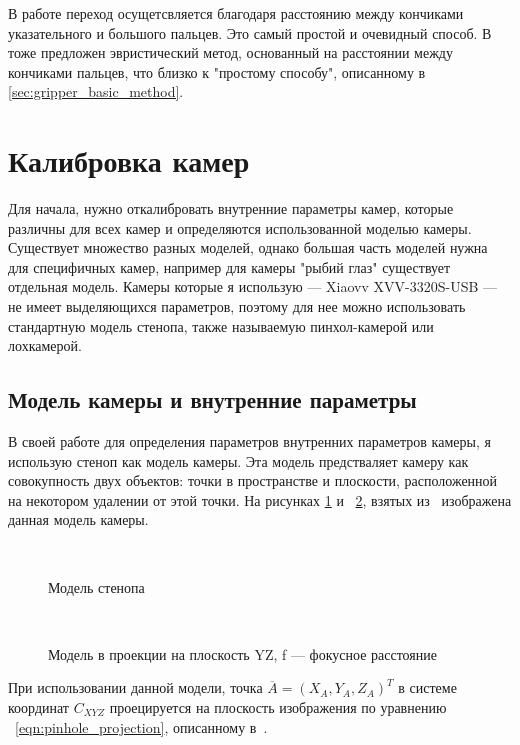 \documentclass[12pt, a4paper]{article}
\begin{document}
В работе \cite{literally-me} переход осущетсвляется благодаря расстоянию между
кончиками указательного и большого пальцев. Это самый простой и очевидный
способ. В~\cite{gesture_control} тоже предложен эвристический метод, основанный
на расстоянии между кончиками пальцев, что близко к "простому способу",
описанному в \ref{sec:gripper_basic_method}.

\section{Калибровка камер}
Для начала, нужно откалибровать внутренние параметры камер, которые различны
для всех камер и определяются использованной моделью камеры. Существует
множество разных моделей, однако большая часть моделей нужна для специфичных
камер, например для камеры "рыбий глаз" существует отдельная модель. Камеры
которые я использую --- Xiaovv XVV-3320S-USB --- не имеет выделяющихся
параметров, поэтому для нее можно использовать стандартную модель стенопа,
также называемую пинхол-камерой или лохкамерой.

\subsection{Модель камеры и внутренние параметры}
\label{sec:camera_model} 
В своей работе для определения параметров внутренних
параметров камеры, я использую стеноп как модель камеры. Эта модель
предстваляет камеру как совокупность двух объектов: точки в пространстве и
плоскости, расположенной на некотором удалении от этой точки. На рисунках
\ref{fig:pinhole_model} и
~\ref{fig:pinhole_geometry}, взятых из~\cite{multiview_cv} изображена данная
модель камеры.

\begin{figure}[h!]
  \centering
  
  \caption{Модель стенопа}
~\label{fig:pinhole_model}
\end{figure}

\begin{figure}[h!]
  \centering
  
  \caption{Модель в проекции на плоскость YZ, f --- фокусное расстояние}
~\label{fig:pinhole_geometry}
\end{figure}

При использовании данной модели, точка $\overline{A} = (X_A, Y_A, Z_A)^T$ в
системе координат $C_{XYZ}$ проецируется на плоскость изображения по уравнению
~\eqref{eqn:pinhole_projection}, описанному в~\cite{multiview_cv}.
\end{document}

